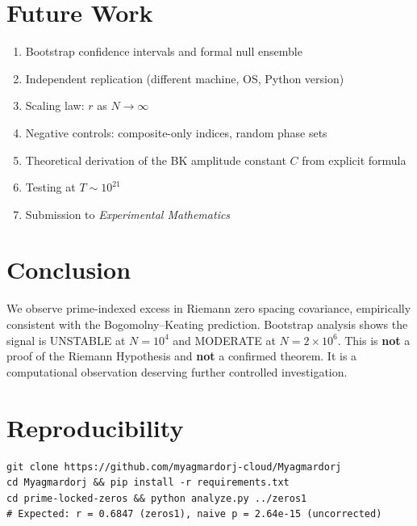 \documentclass[11pt]{article}
\begin{document}
\section{Future Work}

\begin{enumerate}[label=\arabic*.]
\item Bootstrap confidence intervals and formal null ensemble
\item Independent replication (different machine, OS, Python version)
\item Scaling law: $r$ as $N \to \infty$
\item Negative controls: composite-only indices, random phase sets
\item Theoretical derivation of the BK amplitude constant $C$ from explicit formula
\item Testing at $T \sim 10^{21}$
\item Submission to \textit{Experimental Mathematics}
\end{enumerate}

\section{Conclusion}

We observe prime-indexed excess in Riemann zero spacing covariance,
empirically consistent with the Bogomolny--Keating prediction.
Bootstrap analysis shows the signal is UNSTABLE at $N=10^4$ and MODERATE at $N=2\times10^6$.
This is \textbf{not} a proof of the Riemann Hypothesis and
\textbf{not} a confirmed theorem.
It is a computational observation deserving further controlled investigation.

\section*{Reproducibility}
\begin{verbatim}
git clone https://github.com/myagmardorj-cloud/Myagmardorj
cd Myagmardorj && pip install -r requirements.txt
cd prime-locked-zeros && python analyze.py ../zeros1
# Expected: r = 0.6847 (zeros1), naive p = 2.64e-15 (uncorrected)
\end{verbatim}
\end{document}
